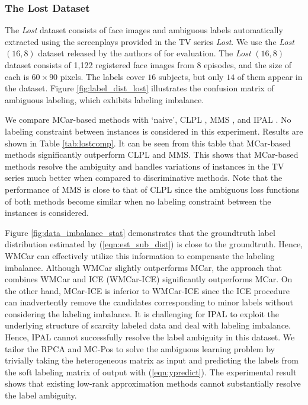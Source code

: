 \documentclass[10pt,journal,compsoc]{IEEEtran}
\begin{document}
\subsubsection{The Lost Dataset}
The \emph{Lost} dataset consists of face images and ambiguous labels automatically extracted using the screenplays provided in the TV series \emph{Lost}. We use the \emph{Lost} $(16,8)$ dataset released by the authors of \cite{Cour2009} for evaluation. The \emph{Lost} $(16,8)$ dataset consists of 1,122 registered face images from $8$ episodes, and the size of each is $60 \times 90$ pixels. The labels cover $16$ subjects, but only $14$ of them appear in the dataset. Figure \ref{fig:label_dist_lost} illustrates the confusion matrix of ambiguous labeling, which exhibits labeling imbalance.


We compare MCar-based methods with `naive', CLPL , MMS \cite{Luo2010}, and IPAL \cite{Zhang2015stp}. No labeling constraint between instances is considered in this experiment. Results are shown in Table \ref{tab:lostcomp}.  It can be seen from this table that MCar-based methods significantly outperform CLPL and MMS. This shows that MCar-based methods resolve the ambiguity and handles variations of instances in the TV series much better when compared to discriminative methods. Note that the performance of MMS is close to that of CLPL since the ambiguous loss functions of both methods become similar when no labeling constraint between the instances is considered.


Figure \ref{fig:data_imbalance_stat} demonstrates that the groundtruth label distribution estimated by (\ref{eqn:est_sub_dist}) is close to the groundtruth. Hence, WMCar can effectively utilize this information to compensate the labeling imbalance. Although WMCar slightly outperforms MCar, the approach that combines WMCar and ICE (WMCar-ICE) significantly outperforms MCar. On the other hand, MCar-ICE is inferior to WMCar-ICE since the ICE procedure can inadvertently remove the candidates corresponding to minor labels without considering the labeling imbalance.
It is challenging for IPAL to exploit the underlying structure of scarcity labeled data and deal with labeling imbalance. Hence, IPAL cannot successfully resolve the label ambiguity in this dataset. We tailor the RPCA \cite{Lin2009} and MC-Pos \cite{Cabral2014} to solve the ambiguous learning problem by trivially taking the heterogeneous matrix as input and predicting the labels from the soft labeling matrix of output with (\ref{eqn:ypredict}). The experimental result shows that existing low-rank approximation methods cannot substantially resolve the label ambiguity.
\end{document}
